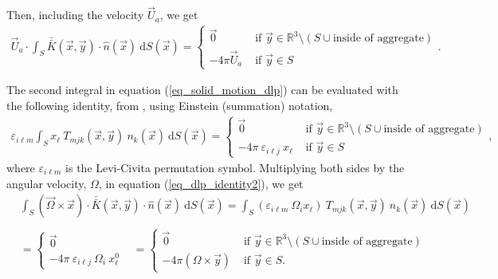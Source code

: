 Then, including the velocity $\vec{U}_a$, we get
\begin{align}
	\vec{U}_a \cdot
	\int_S  \bar{\bar{K}}(\vec{x},\vec{y}) \cdot \hat{n} ( \vec{x})
	\ \text{d}S(\vec{x})
	=
	 \begin{cases}
	 \vec{0}& \text{ if } \vec{y} \in \mathbb{R}^3  \setminus \left( S \cup {\text{inside of aggregate}}\right) 	\\ 
	 - 4\pi \vec{U}_a  & \text{ if } \vec{y} \in S 
	 \end{cases}.
	\label{eq_dlp_Ua}
\end{align}
\par 
The second integral in equation (\ref{eq_solid_motion_dlp}) can be evaluated with the following identity, from \cite{pozrikidis_boundary_1992},
using Einstein (summation) notation, 
\begin{align}
	\varepsilon_{i \ell m}
	\int_S x_{\ell} \ T_{mjk}(\vec{x},\vec{y})  \ n_{k} ( \vec{x})
	\ \text{d}S(\vec{x})
	 = 
	 \begin{cases}
	  \vec{0}
	  & \text{ if } \vec{y} \in \mathbb{R}^3  \setminus  	\left( S \cup {\text{inside of aggregate}}\right) \\ 
	 - 4\pi \ \varepsilon_{i \ell j} \ x_{\ell}
	 & \text{ if } \vec{y} \in S 
	 \end{cases},
	\label{eq_dlp_identity2}
\end{align}
where $\varepsilon_{i \ell m}$ is the Levi-Civita permutation symbol.  
Multiplying both sides by the angular velocity, $\Omega$, in equation (\ref{eq_dlp_identity2}), we get 
\begin{align}
	&
	\int_S
	\left( \vec{\Omega} \times \vec{x} \right)
	 \cdot  \bar{\bar{K}}(\vec{x},\vec{y})  
	\cdot \hat{n} ( \vec{x})
	\ \text{d}S(\vec{x})
	 = 
	\int_S 
	\left(  \varepsilon_{i \ell m} \ \Omega_{i} x_{\ell} \right) \ 	T_{mjk}(\vec{x},\vec{y})  \ n_{k} ( \vec{x})
	\ \text{d}S(\vec{x})
	\nonumber \\
	\nonumber \\
 	& = 
 	\begin{cases}
 	  \vec{0}
 	 &  \\ 
 	- 4\pi \ \varepsilon_{i \ell j}\  \Omega_{i} \ x^0_{\ell}
 	& 
 	\end{cases}
	= \begin{cases}
 	  \vec{0}
 	 & \text{ if } \vec{y} \in \mathbb{R}^3  \setminus  
	 \left( S \cup {\text{inside of aggregate}}\right)
	  \\ 
 	- 4\pi \left(  \Omega \times \vec{y} \right)
 	& \text{ if } \vec{y} \in S.
 	\end{cases}
	\label{eq_dlp_Omega}
\end{align}
